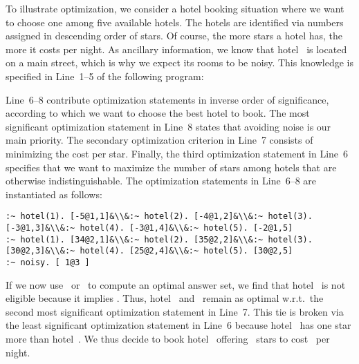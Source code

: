 \begin{example}\label{ex:opt}
To illustrate optimization, we consider a hotel booking situation
where we want to choose one among five available hotels.
The hotels are identified via numbers assigned in descending order of stars.
Of course, the more stars a hotel has, the more it costs per night.
As ancillary information, we know that hotel~ is located
on a main street, which is why we expect its rooms to be noisy.
This knowledge is specified in Line~1--5 of the following program:
%

%
Line~6--8 contribute optimization statements in inverse order of significance,
according to which we want to choose the best hotel to book.
The most significant optimization statement in Line~8 states that
avoiding noise is our main priority.
The secondary optimization criterion in Line~7 consists of
minimizing the cost per star.
Finally, the third optimization statement in Line~6 specifies that we want
to maximize the number of stars among hotels that are otherwise indistinguishable.
The optimization statements in Line~6--8 are instantiated as follows:%
%
\begin{lstlisting}[firstnumber=6,breakindent=0pt,escapechar=&]
:~ hotel(1). [-5@1,1]&\\&:~ hotel(2). [-4@1,2]&\\&:~ hotel(3). [-3@1,3]&\\&:~ hotel(4). [-3@1,4]&\\&:~ hotel(5). [-2@1,5]
:~ hotel(1). [34@2,1]&\\&:~ hotel(2). [35@2,2]&\\&:~ hotel(3). [30@2,3]&\\&:~ hotel(4). [25@2,4]&\\&:~ hotel(5). [30@2,5]
:~ noisy. [ 1@3 ]
\end{lstlisting}
If we now use \clasp\ or \clingo\ to compute an optimal answer set,%
we find that hotel~ is not eligible because it implies .
Thus, hotel~ and~ remain as optimal w.r.t.\ the second most
significant optimization statement in Line~7.
This tie is broken via the least significant optimization statement in Line~6
because hotel~ has one star more than hotel~.
We thus decide to book hotel~ offering~ stars
to cost~ per night.
\eexample
\end{example}


